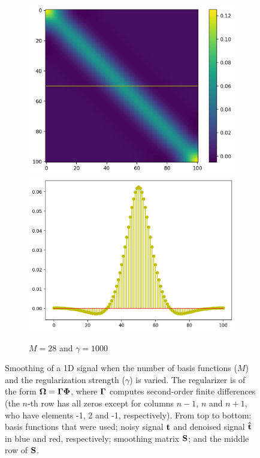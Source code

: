 \documentclass[10pt,twoside]{book}
\begin{document}
\begin{figure}
\begin{subfigure}{0.32\textwidth}
     \includegraphics[width=\textwidth]{smoothing_M28_gamma1000_smoothingMatrix}
     \includegraphics[width=\textwidth]{smoothing_M28_gamma1000_smoothingKernel}
     \caption{$M=28$ and $\gamma=1000$}
     \label{fig:smoothing_M28_gamma1000}
  \end{subfigure}
  \caption{Smoothing of a 1D signal when the number of basis functions ($M$) and the regularization strength ($\gamma$) is varied. 
  The regularizer is of the form ${\mbox{\boldmath {${\Omega}$}}} = {\mbox{\boldmath {${\Gamma}$}}} {\mbox{\boldmath {${\Phi}$}}}$, where ${\mbox{\boldmath {${\Gamma}$}}}$ computes second-order finite differences (the $n$-th row has all zeros except for columns $n-1$, $n$ and $n+1$, who have elements -1, 2 and -1, respectively). From top to bottom: basis functions that were used; noisy signal $\mathbf{t}$ and denoised signal $\mathbf{\hat{t}}$ in blue and red, respectively; smoothing matrix $\mathbf{S}$; and the middle row of $\mathbf{S}$.
  }
  \label{fig:smoothing1D}
\end{figure}
\end{document}
